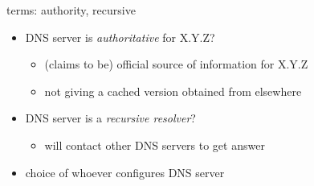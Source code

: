 \begin{frame}{terms: authority, recursive}
    \begin{itemize}
    \item DNS server is \textit{authoritative} for X.Y.Z?
        \begin{itemize}
        \item (claims to be) official source of information for X.Y.Z
        \item not giving a cached version obtained from elsewhere
        \end{itemize}
    \item DNS server is a \textit{recursive resolver}?
        \begin{itemize}
        \item will contact other DNS servers to get answer
        \end{itemize}
    \vspace{.5cm}
    \item choice of whoever configures DNS server
    \end{itemize}
\end{frame}
